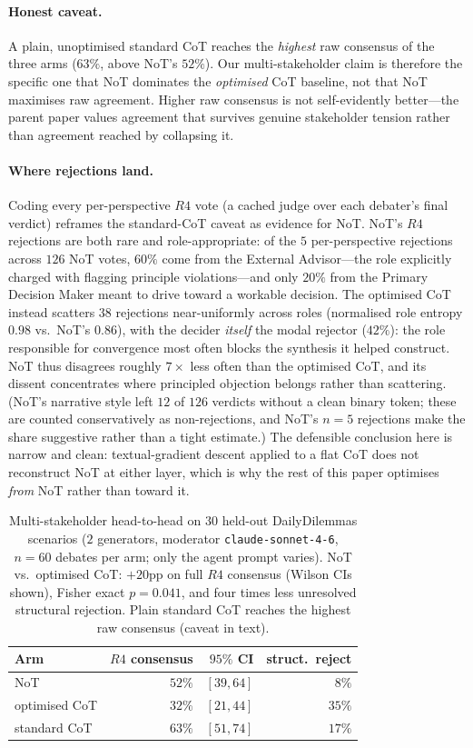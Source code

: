 \documentclass[11pt]{article}
\begin{document}
\paragraph{Honest caveat.}
A plain, unoptimised standard CoT reaches the \emph{highest} raw consensus of the three arms ($63\%$, above NoT's $52\%$).
Our multi-stakeholder claim is therefore the specific one that NoT dominates the \emph{optimised} CoT baseline, not that NoT maximises raw agreement.
Higher raw consensus is not self-evidently better---the parent paper values agreement that survives genuine stakeholder tension rather than agreement reached by collapsing it.

\paragraph{Where rejections land.}
Coding every per-perspective $R4$ vote (a cached judge over each debater's final verdict) reframes the standard-CoT caveat as evidence for NoT.
NoT's $R4$ rejections are both rare and role-appropriate: of the $5$ per-perspective rejections across $126$ NoT votes, $60\%$ come from the External Advisor---the role explicitly charged with flagging principle violations---and only $20\%$ from the Primary Decision Maker meant to drive toward a workable decision.
The optimised CoT instead scatters $38$ rejections near-uniformly across roles (normalised role entropy $0.98$ vs.\ NoT's $0.86$), with the decider \emph{itself} the modal rejector ($42\%$): the role responsible for convergence most often blocks the synthesis it helped construct.
NoT thus disagrees roughly $7\times$ less often than the optimised CoT, and its dissent concentrates where principled objection belongs rather than scattering.
(NoT's narrative style left $12$ of $126$ verdicts without a clean binary token; these are counted conservatively as non-rejections, and NoT's $n = 5$ rejections make the share suggestive rather than a tight estimate.)
The defensible conclusion here is narrow and clean: textual-gradient descent applied to a flat CoT does not reconstruct NoT at either layer, which is why the rest of this paper optimises \emph{from} NoT rather than toward it.

\begin{table}[t]
\centering\small
\begin{tabular}{lrrr}
\toprule
Arm & $R4$ consensus & $95\%$ CI & struct.\ reject \\
\midrule
NoT             & $52\%$ & $[39, 64]$ & $8\%$  \\
optimised CoT   & $32\%$ & $[21, 44]$ & $35\%$ \\
standard CoT    & $63\%$ & $[51, 74]$ & $17\%$ \\
\bottomrule
\end{tabular}
\caption{Multi-stakeholder head-to-head on $30$ held-out DailyDilemmas scenarios ($2$ generators, moderator \texttt{claude-sonnet-4-6}, $n = 60$ debates per arm; only the agent prompt varies). NoT vs.\ optimised CoT: $+20$pp on full $R4$ consensus (Wilson CIs shown), Fisher exact $p = 0.041$, and four times less unresolved structural rejection. Plain standard CoT reaches the highest raw consensus (caveat in text).}
\label{tab:cot_debate}
\end{table}
\end{document}
